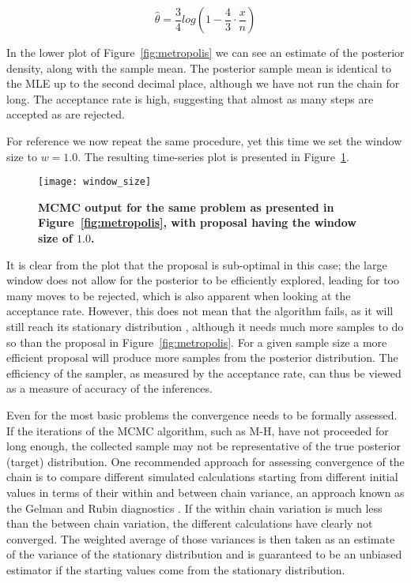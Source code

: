 \begin{equation}
\hat{\theta}=\frac{3}{4}log\left(1-\frac{4}{3}\cdot\frac{x}{n}\right)
\label{eq:mle}
\end{equation}

In the lower plot of Figure~\ref{fig:metropolis} we can see an estimate of the posterior density, along with the sample mean.
The posterior sample mean is identical to the MLE up to the second decimal place, although we have not run the chain for long.
The acceptance rate is high, suggesting that almost as many steps are accepted as are rejected.

For reference we now repeat the same procedure, yet this time we set the window size to $w=1.0$.
The resulting time-series plot is presented in Figure~\ref{fig:window_size}.

\begin{figure}[h!]
\centering
\texttt{[image: window\_size]} 
\caption{
{ \footnotesize 
{\bf MCMC output for the same problem as presented in Figure~\ref{fig:metropolis}, with proposal having the window size of $1.0$.}
}%
}
\label{fig:window_size}
\end{figure}

It is clear from the plot that the proposal is sub-optimal in this case; the large window does not allow for the posterior to be efficiently explored, leading for too many moves to be rejected, which is also apparent when looking at the acceptance rate.
However, this does not mean that the algorithm fails, as it will still reach its stationary distribution \citep{Tierney1994}, although it needs much more samples to do so than the proposal in Figure~\ref{fig:metropolis}. 
For a given sample size a more efficient proposal will produce more samples from the posterior distribution.
The efficiency of the sampler, as measured by the acceptance rate, can thus be viewed as a measure of accuracy of the inferences.

Even for the most basic problems the convergence needs to be formally assessed.
If the iterations of the MCMC algorithm, such as M-H, have not proceeded for long enough, the collected sample may not be representative of the true posterior (target) distribution.
One recommended approach for assessing convergence of the chain is to compare different simulated calculations starting from different initial values in terms of their within and between chain variance, an approach known as the Gelman and Rubin diagnostics \citep{Cowles1996}. 
If the within chain variation is much less than the between chain variation, the different calculations have clearly not converged.
The weighted average of those variances is then taken as an estimate of the variance of the stationary distribution and is guaranteed to be an unbiased estimator if the starting values come from the stationary distribution.

